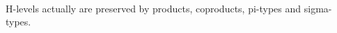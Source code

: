 \begin{code}%
%
\>[2]\<%
\\
\>[2][@{}l@{\AgdaIndent{0}}]%
\>[4]\AgdaSymbol{:}\AgdaSpace{}%
%
\>[9]\AgdaSymbol{\{}\AgdaSpace{}%
\AgdaSymbol{:}\AgdaSpace{}%
\AgdaSpace{}%
\AgdaSymbol{\}}\<%
\\
%
\>[4]\AgdaSpace{}%
\AgdaSymbol{(}\AgdaSpace{}%
\AgdaSymbol{:}\AgdaSpace{}%
\AgdaSpace{}%
\AgdaSpace{}%
\AgdaSpace{}%
\AgdaSymbol{\{}\AgdaSymbol{\})}\<%
\\
%
\>[4]\AgdaSpace{}%
\AgdaSpace{}%
\AgdaSymbol{\{}\AgdaSpace{}%
\AgdaSymbol{\}}\AgdaSpace{}%
\AgdaSpace{}%
\AgdaSpace{}%
\AgdaSymbol{\{}\AgdaSpace{}%
\AgdaSymbol{:}\AgdaSpace{}%
\AgdaSpace{}%
\AgdaSpace{}%
\AgdaSymbol{\}}\<%
\\
%
\>[4]\AgdaSpace{}%
\AgdaSpace{}%
\AgdaSpace{}%
\AgdaSpace{}%
\AgdaFunction{[}\AgdaSpace{}%
\AgdaSymbol{(}\AgdaFunction{\#}\AgdaSpace{}%
\AgdaSpace{}%
\AgdaSymbol{)}\AgdaSpace{}%
\AgdaFunction{/}\AgdaSpace{}%
\AgdaSpace{}%
\AgdaFunction{]}\<%
\\
%
\\[\AgdaEmptyExtraSkip]%
%
\>[2]\AgdaSpace{}%
\AgdaSpace{}%
\AgdaSymbol{\{}\AgdaSymbol{\}}\AgdaSpace{}%
\AgdaSpace{}%
\AgdaSpace{}%
\AgdaSymbol{\{}\AgdaSpace{}%
\AgdaSymbol{=}\AgdaSpace{}%
\AgdaSymbol{\}}\AgdaSpace{}%
\AgdaSymbol{=}\AgdaSpace{}%
\AgdaSpace{}%
\AgdaSymbol{(}\AgdaSpace{}%
\AgdaSymbol{)}\AgdaSpace{}%
\AgdaSpace{}%
\<%
\end{code}

H-levels actually are preserved by products, coproducts, pi-types and sigma-types.


